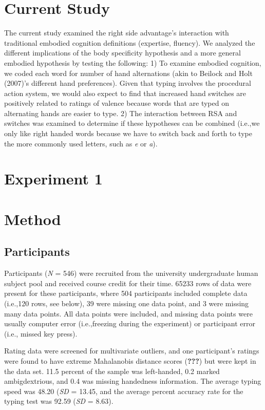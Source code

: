 \documentclass[english,man]{apa6}
\theoremstyle{definition}
\theoremstyle{definition}
\theoremstyle{definition}
\theoremstyle{remark}
\begin{document}
\section{Current Study}\label{current-study}

The current study examined the right side advantage's interaction with
traditional embodied cognition definitions (expertise, fluency). We
analyzed the different implications of the body specificity hypothesis
and a more general embodied hypothesis by testing the following: 1) To
examine embodied cognition, we coded each word for number of hand
alternations (akin to Beilock and Holt (2007)'s different hand
preferences). Given that typing involves the procedural action system,
we would also expect to find that increased hand switches are positively
related to ratings of valence because words that are typed on
alternating hands are easier to type. 2) The interaction between RSA and
switches was examined to determine if these hypotheses can be combined
(i.e.,we only like right handed words because we have to switch back and
forth to type the more commonly used letters, such as \emph{e} or
\emph{a}).

\section{Experiment 1}\label{experiment-1}

\section{Method}\label{method}

\subsection{Participants}\label{participants}

Participants (\emph{N} = 546) were recruited from the university
undergraduate human subject pool and received course credit for their
time. 65233 rows of data were present for these participants, where 504
participants included complete data (i.e.,120 rows, see below), 39 were
missing one data point, and 3 were missing many data points. All data
points were included, and missing data points were usually computer
error (i.e.,freezing during the experiment) or participant error (i.e.,
missed key press).

Rating data were screened for multivariate outliers, and one
participant's ratings were found to have extreme Mahalanobis distance
scores ({\textbf{???}}) but were kept in the data set. 11.5 percent of
the sample was left-handed, 0.2 marked ambigdextrious, and 0.4 was
missing handedness information. The average typing speed was 48.20
(\emph{SD} = 13.45, and the average percent accuracy rate for the typing
test was 92.59 (\emph{SD} = 8.63).
\end{document}

